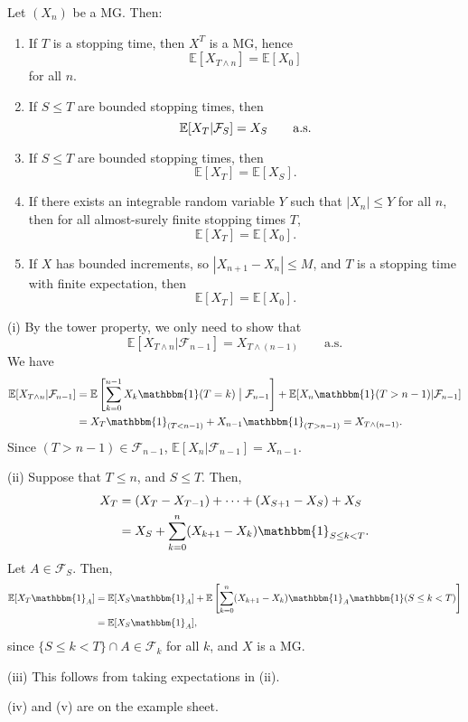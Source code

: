 \documentclass[12pt]{article}
\begin{document}
\begin{theorem}
	Let $(X_n)$ be a MG. Then:
	\begin{enumerate}[\normalfont(i)]
		\item If $T$ is a stopping time, then $X^T$ is a MG, hence
			\[
			\mathbb{E}[X_{T \wedge n}] = \mathbb{E}[X_0]
			\]
			for all $n$.
		\item If $S \leq T$ are bounded stopping times, then
			\[
				\mathbb{E}[X_T|\mathcal{F}_S] = X_S \qquad \text{\normalfont{a.s.}}
			\]
		\item If $S \leq T$ are bounded stopping times, then
			\[
			\mathbb{E}[X_T] = \mathbb{E}[X_S].
			\]
		\item If there exists an integrable random variable $Y$ such that $|X_n| \leq Y$ for all $n$, then for all almost-surely finite stopping times $T$,
			\[
			\mathbb{E}[X_T] = \mathbb{E}[X_0].
			\]
		\item If $X$ has bounded increments, so $|X_{n+1} - X_n| \leq M$, and $T$ is a stopping time with finite expectation, then
			\[
			\mathbb{E}[X_T] = \mathbb{E}[X_0].
			\]
	\end{enumerate}
\end{theorem}

\begin{proofbox}
	

	(i) By the tower property, we only need to show that
	\[
		\mathbb{E}[X_{T \wedge n} | \mathcal{F}_{n-1}] = X_{T \wedge (n-1)} \qquad \text{a.s.}
	\]
	We have
	\begin{align*}
		\mathbb{E}[X_{T \wedge n}|\mathcal{F}_{n-1}] &= \mathbb{E}\left[ \sum_{k = 0}^{n-1} X_k \mathbbm{1}(T = k) \bigm| \mathcal{F}_{n-1} \right] + \mathbb{E}[X_n \mathbbm{1}(T > n-1) | \mathcal{F}_{n-1}] \\
							     &= X_T \mathbbm{1}_{(T < n-1)} + X_{n-1} \mathbbm{1}_{(T > n - 1)} = X_{T \wedge (n - 1)}.
	\end{align*}
	Since $(T > n-1) \in \mathcal{F}_{n-1}$, $\mathbb{E}[X_n|\mathcal{F}_{n-1}] = X_{n-1}$.

	(ii) Suppose that $T \leq n$, and $S \leq T$. Then,
	\begin{align*}
		X_T &= (X_T - X_{T-1}) + \cdots + (X_{S+1} - X_S) + X_S \\
		    &= X_S + \sum_{k = 0}^n (X_{k+1} - X_k) \mathbbm{1}_{S \leq k < T}.
	\end{align*}
	Let $A \in \mathcal{F}_S$. Then,
	\begin{align*}
		\mathbb{E}[X_T \mathbbm{1}_{A}] &= \mathbb{E}[X_S \mathbbm{1}_{A}] + \mathbb{E}\left[ \sum_{k = 0}^n (X_{k+1} - X_k) \mathbbm{1}_{A} \mathbbm{1}(S \leq k < T) \right] \\
						&= \mathbb{E}[X_S \mathbbm{1}_{A}],
	\end{align*}
	since $\{S \leq k < T\} \cap A \in \mathcal{F}_k$ for all $k$, and $X$ is a MG.


	(iii) This follows from taking expectations in (ii).

	(iv) and (v) are on the example sheet.
\end{proofbox}



\newpage

\printindex
\end{document}

